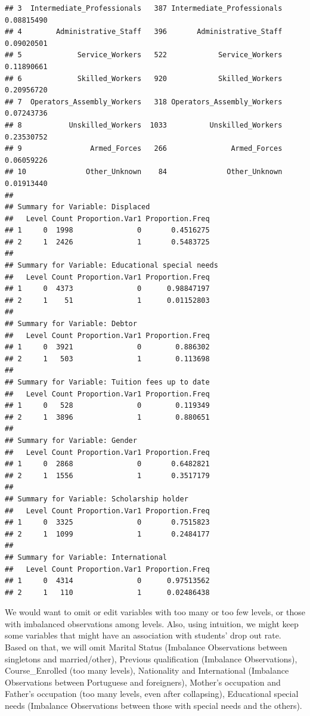 \documentclass[
]{article}
\begin{document}
\begin{verbatim}
## 3  Intermediate_Professionals   387 Intermediate_Professionals      0.08815490
## 4        Administrative_Staff   396       Administrative_Staff      0.09020501
## 5             Service_Workers   522            Service_Workers      0.11890661
## 6             Skilled_Workers   920            Skilled_Workers      0.20956720
## 7  Operators_Assembly_Workers   318 Operators_Assembly_Workers      0.07243736
## 8           Unskilled_Workers  1033          Unskilled_Workers      0.23530752
## 9                Armed_Forces   266               Armed_Forces      0.06059226
## 10              Other_Unknown    84              Other_Unknown      0.01913440
## 
## Summary for Variable: Displaced 
##   Level Count Proportion.Var1 Proportion.Freq
## 1     0  1998               0       0.4516275
## 2     1  2426               1       0.5483725
## 
## Summary for Variable: Educational special needs 
##   Level Count Proportion.Var1 Proportion.Freq
## 1     0  4373               0      0.98847197
## 2     1    51               1      0.01152803
## 
## Summary for Variable: Debtor 
##   Level Count Proportion.Var1 Proportion.Freq
## 1     0  3921               0        0.886302
## 2     1   503               1        0.113698
## 
## Summary for Variable: Tuition fees up to date 
##   Level Count Proportion.Var1 Proportion.Freq
## 1     0   528               0        0.119349
## 2     1  3896               1        0.880651
## 
## Summary for Variable: Gender 
##   Level Count Proportion.Var1 Proportion.Freq
## 1     0  2868               0       0.6482821
## 2     1  1556               1       0.3517179
## 
## Summary for Variable: Scholarship holder 
##   Level Count Proportion.Var1 Proportion.Freq
## 1     0  3325               0       0.7515823
## 2     1  1099               1       0.2484177
## 
## Summary for Variable: International 
##   Level Count Proportion.Var1 Proportion.Freq
## 1     0  4314               0      0.97513562
## 2     1   110               1      0.02486438
\end{verbatim}

We would want to omit or edit variables with too many or too few levels,
or those with imbalanced observations among levels. Also, using
intuition, we might keep some variables that might have an association
with students' drop out rate. Based on that, we will omit Marital Status
(Imbalance Observations between singletons and married/other), Previous
qualification (Imbalance Observations), Course\_Enrolled (too many
levels), Nationality and International (Imbalance Observations between
Portuguese and foreigners), Mother's occupation and Father's occupation
(too many levels, even after collapsing), Educational special needs
(Imbalance Observations between those with special needs and the
others).
\end{document}
